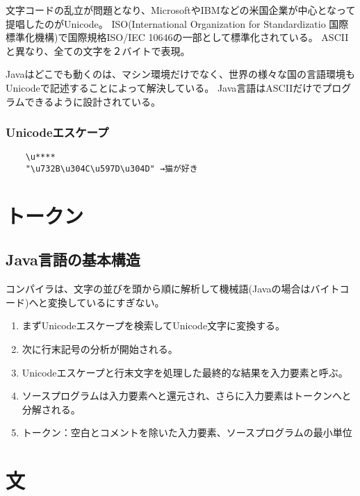 \documentclass[12pt,a4j,twoside]{jsbook}
\begin{document}
文字コードの乱立が問題となり、MicrosoftやIBMなどの米国企業が中心となって提唱したのがUnicode。
ISO(International Organization for Standardizatio 国際標準化機構)で国際規格ISO/IEC 10646の一部として標準化されている。
ASCIIと異なり、全ての文字を２バイトで表現。

Javaはどこでも動くのは、マシン環境だけでなく、世界の様々な国の言語環境もUnicodeで記述することによって解決している。
Java言語はASCIIだけでプログラムできるように設計されている。

\subsubsection*{Unicodeエスケープ}
\begin{lstlisting}
    \u****
    "\u732B\u304C\u597D\u304D" →猫が好き
\end{lstlisting}
\section{トークン}
\subsection{Java言語の基本構造}
コンパイラは、文字の並びを頭から順に解析して機械語(Javaの場合はバイトコード)へと変換しているにすぎない。
\begin{enumerate}
    \item まずUnicodeエスケープを検索してUnicode文字に変換する。
    \item 次に行末記号の分析が開始される。
    \item Unicodeエスケープと行末文字を処理した最終的な結果を入力要素と呼ぶ。
    \item ソースプログラムは入力要素へと還元され、さらに入力要素はトークンへと分解される。
    \item トークン：空白とコメントを除いた入力要素、ソースプログラムの最小単位
\end{enumerate}
\section{文}
\end{document}
